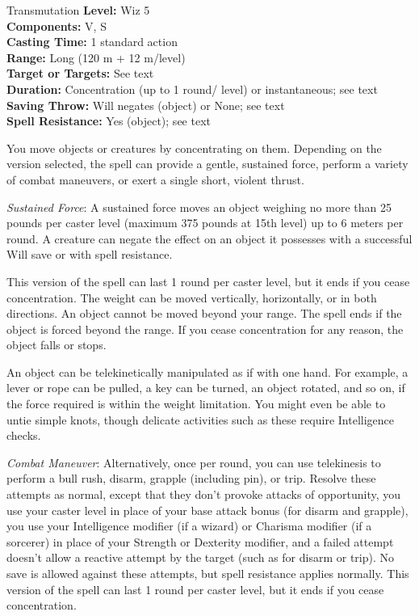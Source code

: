 {Transmutation}
{
	\textbf{Level:}
	Wiz 5\\
	\textbf{Components:}
	V, S\\
	\textbf{Casting Time:}
	1 standard action\\
	\textbf{Range:}
	Long (120 m + 12 m/level)\\
	\textbf{Target or Targets:}
	See text\\
	\textbf{Duration:}
	Concentration (up to 1 round/ level) or instantaneous; see text\\
	\textbf{Saving Throw:}
	Will negates (object) or None; see text\\
	\textbf{Spell Resistance:}
	Yes (object); see text\\
}
{
	You move objects or creatures by concentrating on them. Depending on the version selected, the spell can provide a gentle, sustained force, perform a variety of combat maneuvers, or exert a single short, violent thrust.

	\textit{Sustained Force}:
	A sustained force moves an object weighing no more than 25 pounds per caster level (maximum 375 pounds at 15th level) up to 6 meters per round. A creature can negate the effect on an object it possesses with a successful Will save or with spell resistance.

	This version of the spell can last 1 round per caster level, but it ends if you cease concentration. The weight can be moved vertically, horizontally, or in both directions. An object cannot be moved beyond your range. The spell ends if the object is forced beyond the range. If you cease concentration for any reason, the object falls or stops.

	An object can be telekinetically manipulated as if with one hand. For example, a lever or rope can be pulled, a key can be turned, an object rotated, and so on, if the force required is within the weight limitation. You might even be able to untie simple knots, though delicate activities such as these require Intelligence checks.

	\textit{Combat Maneuver}:
	Alternatively, once per round, you can use telekinesis to perform a bull rush, disarm, grapple (including pin), or trip. Resolve these attempts as normal, except that they don't provoke attacks of opportunity, you use your caster level in place of your base attack bonus (for disarm and grapple), you use your Intelligence modifier (if a wizard) or Charisma modifier (if a sorcerer) in place of your Strength or Dexterity modifier, and a failed attempt doesn't allow a reactive attempt by the target (such as for disarm or trip). No save is allowed against these attempts, but spell resistance applies normally. This version of the spell can last 1 round per caster level, but it ends if you cease concentration.

}
